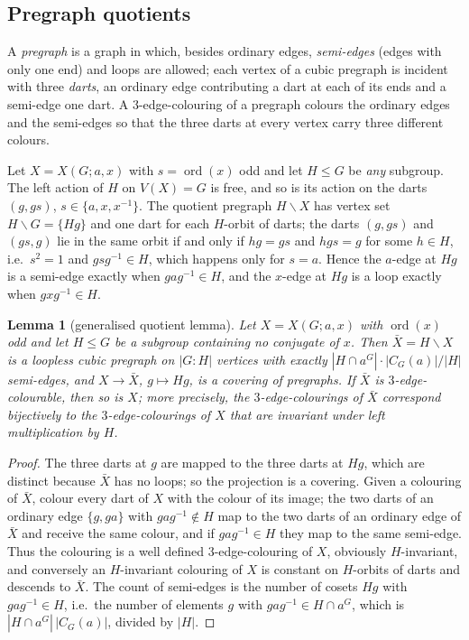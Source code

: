 \documentclass[11pt,a4paper]{article}
\newtheorem{lemma}[theorem]{Lemma}
\theoremstyle{definition}
\theoremstyle{remark}
\newcommand{\ord}{\operatorname{ord}}
\newcommand{\X}[3]{X(#1;#2,#3)}
\begin{document}
\subsection{Pregraph quotients}\label{sec:pregraph}
A \emph{pregraph} is a graph in which, besides ordinary edges, \emph{semi-edges} (edges with only one end) and loops are allowed; each vertex of a cubic pregraph is incident with three \emph{darts}, an ordinary edge contributing a dart at each of its ends and a semi-edge one dart.  A $3$-edge-colouring of a pregraph colours the ordinary edges and the semi-edges so that the three darts at every vertex carry three different colours.

Let $X=\X{G}{a}{x}$ with $s=\ord(x)$ odd and let $H\le G$ be \emph{any} subgroup.  The left action of $H$ on $V(X)=G$ is free, and so is its action on the darts $(g,gs)$, $s\in\{a,x,x^{-1}\}$.  The quotient pregraph $H\backslash X$ has vertex set $H\backslash G=\{Hg\}$ and one dart for each $H$-orbit of darts; the darts $(g,gs)$ and $(gs,g)$ lie in the same orbit if and only if $hg=gs$ and $hgs=g$ for some $h\in H$, i.e.\ $s^2=1$ and $gsg^{-1}\in H$, which happens only for $s=a$.  Hence the $a$-edge at $Hg$ is a semi-edge exactly when $gag^{-1}\in H$, and the $x$-edge at $Hg$ is a loop exactly when $gxg^{-1}\in H$.

\begin{lemma}[generalised quotient lemma]\label{lem:pregraph}
Let $X=\X{G}{a}{x}$ with $\ord(x)$ odd and let $H\le G$ be a subgroup containing no conjugate of $x$.  Then $\bar X=H\backslash X$ is a loopless cubic pregraph on $|G:H|$ vertices with exactly $|H\cap a^G|\cdot|C_G(a)|/|H|$ semi-edges, and $X\to\bar X$, $g\mapsto Hg$, is a covering of pregraphs.  If $\bar X$ is $3$-edge-colourable, then so is $X$; more precisely, the $3$-edge-colourings of $\bar X$ correspond bijectively to the $3$-edge-colourings of $X$ that are invariant under left multiplication by $H$.
\end{lemma}
\begin{proof}
The three darts at $g$ are mapped to the three darts at $Hg$, which are distinct because $\bar X$ has no loops; so the projection is a covering.  Given a colouring of $\bar X$, colour every dart of $X$ with the colour of its image; the two darts of an ordinary edge $\{g,ga\}$ with $gag^{-1}\notin H$ map to the two darts of an ordinary edge of $\bar X$ and receive the same colour, and if $gag^{-1}\in H$ they map to the same semi-edge.  Thus the colouring is a well defined $3$-edge-colouring of $X$, obviously $H$-invariant, and conversely an $H$-invariant colouring of $X$ is constant on $H$-orbits of darts and descends to $\bar X$.  The count of semi-edges is the number of cosets $Hg$ with $gag^{-1}\in H$, i.e.\ the number of elements $g$ with $gag^{-1}\in H\cap a^G$, which is $|H\cap a^G|\,|C_G(a)|$, divided by $|H|$.
\end{proof}
\end{document}
